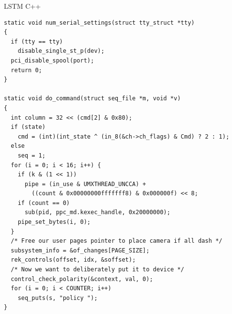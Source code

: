 \documentclass[10pt,xcolor=dvipsnames]{beamer}
\begin{document}
\begin{frame}[fragile]{LSTM C++}

\begin{lstlisting}[basicstyle=\tiny\ttfamily]
static void num_serial_settings(struct tty_struct *tty)
{
  if (tty == tty)
    disable_single_st_p(dev);
  pci_disable_spool(port);
  return 0;
}

static void do_command(struct seq_file *m, void *v)
{
  int column = 32 << (cmd[2] & 0x80);
  if (state)
    cmd = (int)(int_state ^ (in_8(&ch->ch_flags) & Cmd) ? 2 : 1);
  else
    seq = 1;
  for (i = 0; i < 16; i++) {
    if (k & (1 << 1))
      pipe = (in_use & UMXTHREAD_UNCCA) +
        ((count & 0x00000000fffffff8) & 0x000000f) << 8;
    if (count == 0)
      sub(pid, ppc_md.kexec_handle, 0x20000000);
    pipe_set_bytes(i, 0);
  }
  /* Free our user pages pointer to place camera if all dash */
  subsystem_info = &of_changes[PAGE_SIZE];
  rek_controls(offset, idx, &soffset);
  /* Now we want to deliberately put it to device */
  control_check_polarity(&context, val, 0);
  for (i = 0; i < COUNTER; i++)
    seq_puts(s, "policy ");
}
\end{lstlisting}
\end{frame}
\end{document}

